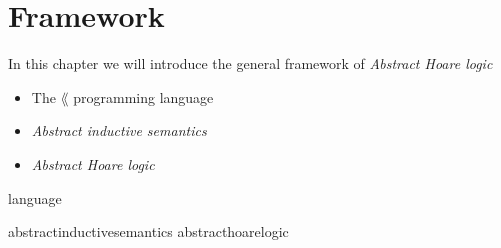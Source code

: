 \chapter{Framework}

In this chapter we will introduce the general framework of 
\textit{Abstract Hoare logic}

\begin{itemize}
  \item The $\lang$ programming language
  \item \textit{Abstract inductive semantics}
  \item \textit{Abstract Hoare logic}
\end{itemize}

{language}

{abstractinductivesemantics}
{abstracthoarelogic}
